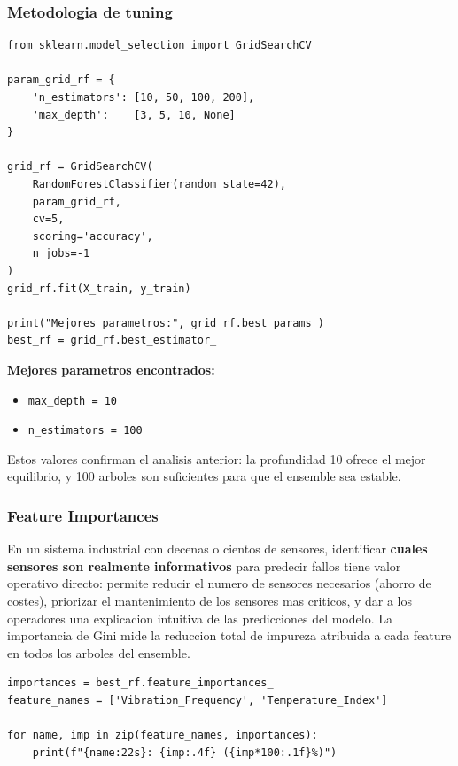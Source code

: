 \documentclass[12pt,a4paper]{article}
\begin{document}
\subsubsection*{Metodologia de tuning}

\begin{lstlisting}[caption={GridSearchCV para Random Forest}]
from sklearn.model_selection import GridSearchCV

param_grid_rf = {
    'n_estimators': [10, 50, 100, 200],
    'max_depth':    [3, 5, 10, None]
}

grid_rf = GridSearchCV(
    RandomForestClassifier(random_state=42),
    param_grid_rf,
    cv=5,
    scoring='accuracy',
    n_jobs=-1
)
grid_rf.fit(X_train, y_train)

print("Mejores parametros:", grid_rf.best_params_)
best_rf = grid_rf.best_estimator_
\end{lstlisting}

\begin{tcolorbox}[resultbox]
  \textbf{Mejores parametros encontrados:}
  \begin{itemize}
    \item \texttt{max\_depth = 10}
    \item \texttt{n\_estimators = 100}
  \end{itemize}
  Estos valores confirman el analisis anterior: la profundidad 10 ofrece el mejor equilibrio, y
  100 arboles son suficientes para que el ensemble sea estable.
\end{tcolorbox}

\subsubsection*{Feature Importances}

\begin{tcolorbox}[porquebox, title={Por que las Feature Importances son valiosas en mantenimiento predictivo?}]
En un sistema industrial con decenas o cientos de sensores, identificar \textbf{cuales sensores
son realmente informativos} para predecir fallos tiene valor operativo directo: permite reducir
el numero de sensores necesarios (ahorro de costes), priorizar el mantenimiento de los sensores
mas criticos, y dar a los operadores una explicacion intuitiva de las predicciones del modelo.
La importancia de Gini mide la reduccion total de impureza atribuida a cada feature en todos
los arboles del ensemble.
\end{tcolorbox}

\begin{lstlisting}[caption={Analisis de importancia de variables}]
importances = best_rf.feature_importances_
feature_names = ['Vibration_Frequency', 'Temperature_Index']

for name, imp in zip(feature_names, importances):
    print(f"{name:22s}: {imp:.4f} ({imp*100:.1f}%)")
\end{lstlisting}
\end{document}
